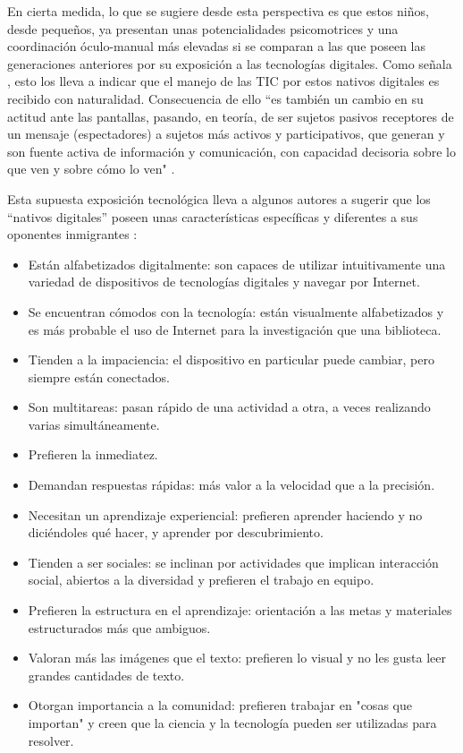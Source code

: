 \documentclass[spanish]{textolivre}
\begin{document}
En cierta medida, lo que se sugiere desde esta perspectiva es que estos niños, desde pequeños, ya presentan unas potencialidades psicomotrices y una coordinación óculo-manual más elevadas si se comparan a las que poseen las generaciones anteriores por su exposición a las tecnologías digitales. Como señala \textcite{granado_palma_educacion_2019}, esto los lleva a indicar que el manejo de las TIC por estos nativos digitales es recibido con naturalidad. Consecuencia de ello “es también un cambio en su actitud ante las pantallas, pasando, en teoría, de ser sujetos pasivos receptores de un mensaje (espectadores) a sujetos más activos y participativos, que generan y son fuente activa de información y comunicación, con capacidad decisoria sobre lo que ven y sobre cómo lo ven" \cite[p. 29]{granado_palma_educacion_2019}.

Esta supuesta exposición tecnológica lleva a algunos autores a sugerir que los “nativos digitales” poseen unas características específicas y diferentes a sus oponentes inmigrantes \cite{lai_technology_2015, underwood_learning_2015, desmurget_fabrica_2020}:

\begin{itemize}
    \item Están alfabetizados digitalmente: son capaces de utilizar intuitivamente una variedad de dispositivos de tecnologías digitales y navegar por Internet.
    \item Se encuentran cómodos con la tecnología: están visualmente alfabetizados y es más probable el uso de Internet para la investigación que una biblioteca.
    \item Tienden a la impaciencia: el dispositivo en particular puede cambiar, pero siempre están conectados.
    \item Son multitareas: pasan rápido de una actividad a otra, a veces realizando varias simultáneamente.
    \item Prefieren la inmediatez.
    \item Demandan respuestas rápidas: más valor a la velocidad que a la precisión. 
    \item Necesitan un aprendizaje experiencial: prefieren aprender haciendo y no diciéndoles qué hacer, y aprender por descubrimiento.
    \item Tienden a ser sociales: se inclinan por actividades que implican interacción social, abiertos a la diversidad y prefieren el trabajo en equipo.
    \item Prefieren la estructura en el aprendizaje: orientación a las metas y materiales estructurados más que ambiguos.
    \item Valoran más las imágenes que el texto: prefieren lo visual y no les gusta leer grandes cantidades de texto.
    \item Otorgan importancia a la comunidad: prefieren trabajar en "cosas que importan" y creen que la ciencia y la tecnología pueden ser utilizadas para resolver.
\end{itemize}
\end{document}
